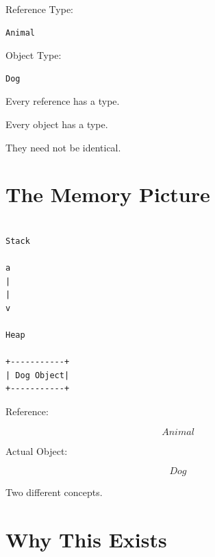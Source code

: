 \documentclass[11pt,a4paper]{book}
\begin{document}
Reference Type:

\begin{verbatim}
Animal
\end{verbatim}


Object Type:

\begin{verbatim}
Dog
\end{verbatim}


\begin{rosettarule}

Every reference has a type.

Every object has a type.

They need not be identical.

\end{rosettarule}


\section{The Memory Picture}

\begin{verbatim}

Stack

a
|
|
v

Heap

+-----------+
| Dog Object|
+-----------+

\end{verbatim}


Reference:

\[
Animal
\]


Actual Object:

\[
Dog
\]


Two different concepts.


\section{Why This Exists}
\end{document}
